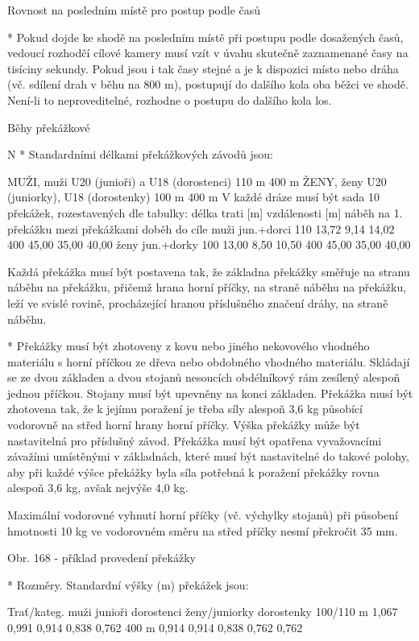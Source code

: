 Rovnost na posledním místě pro postup podle časů

* Pokud dojde ke shodě na posledním místě při postupu podle dosažených časů, vedoucí rozhodčí cílové kamery musí vzít v úvahu skutečně zaznamenané časy na tisíciny sekundy. Pokud jsou i tak časy stejné a je k dispozici místo nebo dráha (vč. sdílení drah v běhu na 800 m), postupují do dalšího kola oba běžci ve shodě. Není-li to neproveditelné, rozhodne o postupu do dalšího kola los.
\enditems

\secc Běhy překážkové

\begitems \style N
* Standardními délkami překážkových závodů jsou:

MUŽI, muži U20 (junioři)  a  U18 (dorostenci)      110 m     400 m
ŽENY, ženy U20 (juniorky), U18 (dorostenky)     100 m     400 m
V každé dráze musí být sada 10 překážek, rozestavených dle tabulky:
  délka trati [m]	vzdálenosti [m]
    náběh na 1. překážku	mezi překážkami	doběh do cíle
muži
jun.+dorci	110	13,72	9,14	14,02
	400	45,00	35,00	40,00
ženy
jun.+dorky	100	13,00	8,50	10,50
	400	45,00	35,00	40,00

Každá překážka musí být postavena tak, že základna překážky směřuje na stranu náběhu na překážku, přičemž hrana horní příčky, na straně náběhu na překážku, leží ve svislé rovině, procházející hranou příslušného značení dráhy, na straně náběhu.

* Překážky musí být zhotoveny z kovu nebo jiného nekovového vhodného materiálu s horní příčkou ze dřeva nebo obdobného vhodného materiálu. Skládají se ze dvou základen a dvou stojanů nesoucích obdélníkový rám zesílený alespoň jednou příčkou. Stojany musí být upevněny na konci základen. Překážka musí být zhotovena tak, že k jejímu poražení je třeba síly alespoň 3,6 kg působící vodorovně na střed horní hrany horní příčky. Výška překážky může být nastavitelná pro příslušný závod. Překážka musí být opatřena vyvažovacími závažími umístěnými v základnách, které musí být nastavitelné do takové polohy, aby při každé výšce překážky byla síla potřebná k poražení překážky rovna alespoň 3,6 kg, avšak nejvýše 4,0 kg.

Maximální vodorovné vyhnutí horní příčky (vč. výchylky stojanů) při působení hmotnosti 10 kg ve vodorovném směru na střed příčky nesmí překročit 35 mm.

Obr. 168 - příklad provedení překážky

* Rozměry. Standardní výšky (m) překážek jsou:

    Trať/kateg.	muži	junioři 	dorostenci	ženy/juniorky	dorostenky
     100/110 m	1,067	0,991	0,914	0,838	0,762
     400 m	0,914	0,914	0,838	0,762	0,762


